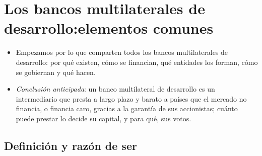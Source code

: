 \documentclass[11pt]{article}
\begin{document}
\section{Los bancos multilaterales de desarrollo:\cortetitulo elementos comunes}\label{sec:comunes}

\begin{itemize}
\item Empezamos por lo que comparten todos los bancos multilaterales de desarrollo: por qué existen, cómo se financian, qué entidades los forman, cómo se gobiernan y qué hacen.
\item \emph{Conclusión anticipada}: un banco multilateral de desarrollo es un intermediario que presta a largo plazo y barato a países que el mercado no financia, o financia caro, gracias a la garantía de sus accionistas; cuánto puede prestar lo decide su capital, y para qué, sus votos.
\end{itemize}

\subsection{Definición y razón de ser}\label{sec:definicion}
\end{document}
